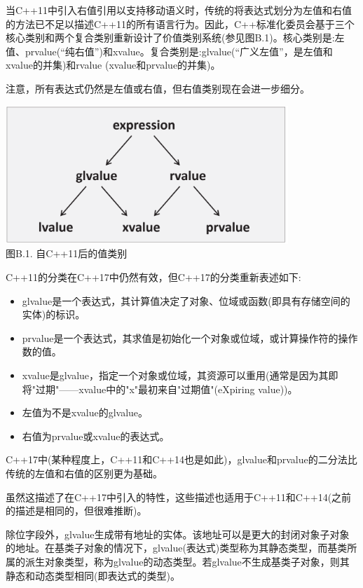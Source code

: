 
当C++11中引入右值引用以支持移动语义时，传统的将表达式划分为左值和右值的方法已不足以描述C++11的所有语言行为。因此，C++标准化委员会基于三个核心类别和两个复合类别重新设计了价值类别系统(参见图B.1)。核心类别是:左值、prvalue(“纯右值”)和xvalue。复合类别是:glvalue(“广义左值”，是左值和xvalue的并集)和rvalue (xvalue和prvalue的并集)。

注意，所有表达式仍然是左值或右值，但右值类别现在会进一步细分。

\begin{center}
\includegraphics[width=0.8\textwidth]{content/Appendix/B/images/1.png} \\
图B.1. 自C++11后的值类别
\end{center}

C++11的分类在C++17中仍然有效，但C++17的分类重新表述如下:

\begin{itemize}
\item 
glvalue是一个表达式，其计算值决定了对象、位域或函数(即具有存储空间的实体)的标识。

\item 
prvalue是一个表达式，其求值是初始化一个对象或位域，或计算操作符的操作数的值。

\item 
xvalue是glvalue，指定一个对象或位域，其资源可以重用(通常是因为其即将"过期"——xvalue中的"x"最初来自"过期值"(eXpiring value))。

\item 
左值为不是xvalue的glvalue。

\item 
右值为prvalue或xvalue的表达式。
\end{itemize}

C++17中(某种程度上，C++11和C++14也是如此)，glvalue和prvalue的二分法比传统的左值和右值的区别更为基础。

虽然这描述了在C++17中引入的特性，这些描述也适用于C++11和C++14(之前的描述是相同的，但很难推断)。

除位字段外，glvalue生成带有地址的实体。该地址可以是更大的封闭对象子对象的地址。在基类子对象的情况下，glvalue(表达式)类型称为其静态类型，而基类所属的派生对象类型，称为glvalue的动态类型。若glvalue不生成基类子对象，则其静态和动态类型相同(即表达式的类型)。

